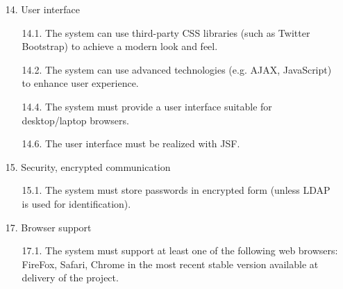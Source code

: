 \begin{enumerate}

\item[14.] User interface

	\begin{enumerate}
	\item[14.1.] The system can use third-party CSS libraries (such as Twitter Bootstrap) to achieve a modern look and feel. %
	\item[14.2.] The system can use advanced technologies (e.g. AJAX, JavaScript) to enhance user experience. %
	\item[14.4.] The system must provide a user interface suitable for desktop/laptop browsers. %
	\item[14.6.] The user interface must be realized with JSF. %
	\end{enumerate}

\item[15.] Security, encrypted communication

	\begin{enumerate}
	\item[15.1.] The system must store passwords in encrypted form (unless LDAP is used for
	identification). %
	\end{enumerate}

%
%	
%	


\item[17.] Browser support

	\begin{enumerate}
	\item[17.1.] The system must support at least one of the following web browsers: FireFox, Safari,
	Chrome in the most recent stable version available at delivery of the project. %
	\end{enumerate}

\end{enumerate}




